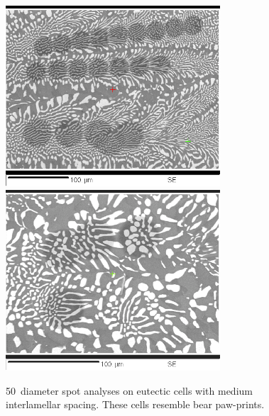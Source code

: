 \begin{figure}[htbp]
\begin{center}
\includegraphics[width=8cm]{manual11_lines_3to5}
\includegraphics[width=8cm]{manual12_to15}
\caption{50\micro\metre\ diameter spot analyses on eutectic cells with medium interlamellar spacing.  These cells resemble bear paw-prints.}\label{fig:bear}
\end{center}
\end{figure}
%

